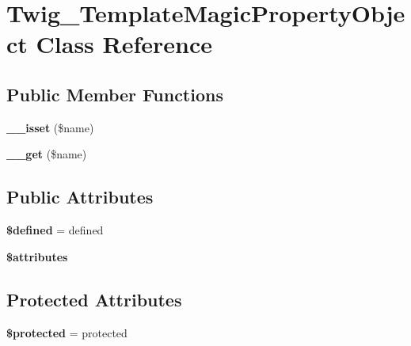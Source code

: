\hypertarget{classTwig__TemplateMagicPropertyObject}{}\section{Twig\+\_\+\+Template\+Magic\+Property\+Object Class Reference}
\label{classTwig__TemplateMagicPropertyObject}
\subsection*{Public Member Functions}
\begin{DoxyCompactItemize}
\item 
{\bfseries \+\_\+\+\_\+isset} (\$name)\hypertarget{classTwig__TemplateMagicPropertyObject_a9d3bba2d6718a538c2e2ab7c5aa911e1}{}\label{classTwig__TemplateMagicPropertyObject_a9d3bba2d6718a538c2e2ab7c5aa911e1}

\item 
{\bfseries \+\_\+\+\_\+get} (\$name)\hypertarget{classTwig__TemplateMagicPropertyObject_a71619af3a04a85710a5e3624351f97f7}{}\label{classTwig__TemplateMagicPropertyObject_a71619af3a04a85710a5e3624351f97f7}

\end{DoxyCompactItemize}
\subsection*{Public Attributes}
\begin{DoxyCompactItemize}
\item 
{\bfseries \$defined} = \textquotesingle{}defined\textquotesingle{}\hypertarget{classTwig__TemplateMagicPropertyObject_ac28f112666a9c19059853be4878f72ab}{}\label{classTwig__TemplateMagicPropertyObject_ac28f112666a9c19059853be4878f72ab}

\item 
{\bfseries \$attributes}
\end{DoxyCompactItemize}
\subsection*{Protected Attributes}
\begin{DoxyCompactItemize}
\item 
{\bfseries \$protected} = \textquotesingle{}protected\textquotesingle{}\hypertarget{classTwig__TemplateMagicPropertyObject_adf74934b6878b23eb4e1822067aaf7b9}{}\label{classTwig__TemplateMagicPropertyObject_adf74934b6878b23eb4e1822067aaf7b9}

\end{DoxyCompactItemize}


